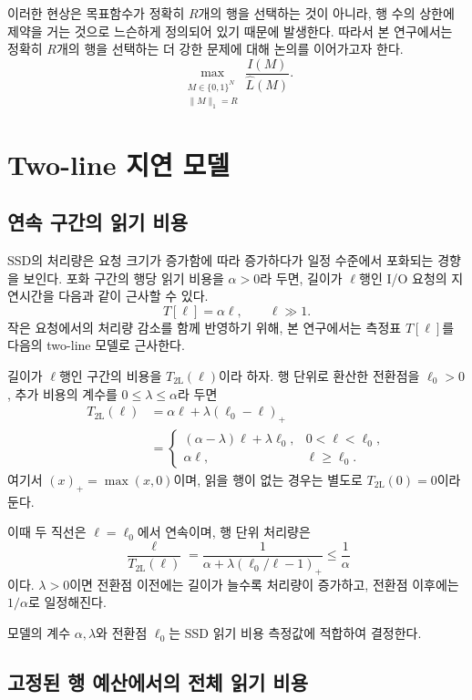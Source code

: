 이러한 현상은 목표함수가 정확히 $R$개의 행을 선택하는 것이 아니라, 행 수의 상한에 제약을 거는 것으로 느슨하게 정의되어 있기 때문에 발생한다. 따라서 본 연구에서는 정확히 $R$개의 행을 선택하는 더 강한 문제에 대해 논의를 이어가고자 한다.
\[
\boxed{
\max_{\substack{M\in\{0,1\}^N\\\|M\|_1=R}}
\frac{I(M)}{\widehat L(M)}.
}
\]

\section{Two-line 지연 모델}\label{sec:two-line}

\subsection{연속 구간의 읽기 비용}\label{sec:two-line-chunk}

SSD의 처리량은 요청 크기가 증가함에 따라 증가하다가 일정 수준에서 포화되는 경향을 보인다. 포화 구간의 행당 읽기 비용을 $\alpha>0$라 두면, 길이가 $\ell$행인 I/O 요청의 지연시간을 다음과 같이 근사할 수 있다.
\[
T[\ell]=\alpha\ell,
\qquad \ell\gg1.
\]
작은 요청에서의 처리량 감소를 함께 반영하기 위해, 본 연구에서는 측정표 $T[\ell]$를 다음의 two-line 모델로 근사한다.

길이가 $\ell$행인 구간의 비용을 $T_{\mathrm{2L}}(\ell)$이라 하자. 행 단위로 환산한 전환점을 $\ell_0>0$, 추가 비용의 계수를 $0\le\lambda\le\alpha$라 두면
\[
\boxed{
\begin{aligned}
T_{\mathrm{2L}}(\ell)
&=\alpha\ell+\lambda(\ell_0-\ell)_+\\
&=
\begin{cases}
(\alpha-\lambda)\ell+\lambda\ell_0,
&0<\ell<\ell_0,\\
\alpha\ell,
&\ell\ge\ell_0.
\end{cases}
\end{aligned}
}
\]
여기서 $(x)_+=\max(x,0)$이며, 읽을 행이 없는 경우는 별도로 $T_{\mathrm{2L}}(0)=0$이라 둔다.

이때 두 직선은 $\ell=\ell_0$에서 연속이며, 행 단위 처리량은
\[
\frac{\ell}{T_{\mathrm{2L}}(\ell)}
=
\frac{1}{\alpha+\lambda(\ell_0/\ell-1)_+}
\le\frac1\alpha
\]
이다. $\lambda>0$이면 전환점 이전에는 길이가 늘수록 처리량이 증가하고, 전환점 이후에는 $1/\alpha$로 일정해진다.

모델의 계수 $\alpha,\lambda$와 전환점 $\ell_0$는 SSD 읽기 비용 측정값에 적합하여 결정한다.

\subsection{고정된 행 예산에서의 전체 읽기 비용}\label{sec:two-line-total}


